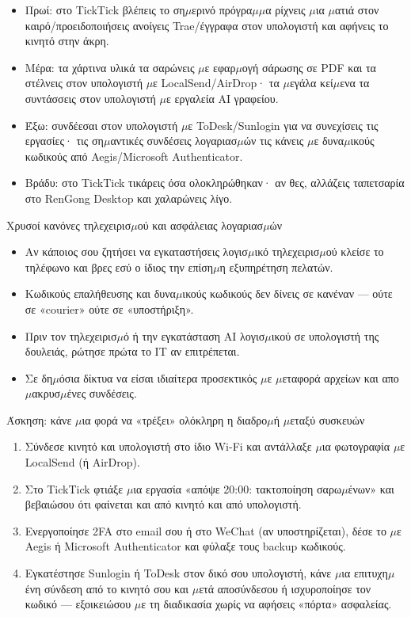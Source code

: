 \begin{itemize}
  \item Πρωί: στο TickTick βλέπεις το ση$\mu$ερινό πρόγρα$\mu$$\mu$α ρίχνεις $\mu$ια $\mu$ατιά στον καιρό/προειδοποιήσεις ανοίγεις Trae/έγγραφα στον υπολογιστή και αφήνεις το κινητό στην άκρη.
  \item Μέρα: τα χάρτινα υλικά τα σαρώνεις $\mu$ε εφαρ$\mu$ογή σάρωσης σε PDF και τα στέλνεις στον υπολογιστή $\mu$ε LocalSend/AirDrop· τα $\mu$εγάλα κεί$\mu$ενα τα συντάσσεις στον υπολογιστή $\mu$ε εργαλεία AI γραφείου.
  \item Έξω: συνδέεσαι στον υπολογιστή $\mu$ε ToDesk/Sunlogin για να συνεχίσεις τις εργασίες· τις ση$\mu$αντικές συνδέσεις λογαριασ$\mu$ών τις κάνεις $\mu$ε δυνα$\mu$ικούς κωδικούς από Aegis/Microsoft Authenticator.
  \item Βράδυ: στο TickTick τικάρεις όσα ολοκληρώθηκαν· αν θες, αλλάζεις ταπετσαρία στο RenGong Desktop και χαλαρώνεις λίγο.
\end{itemize}

\begin{tcbwarn}{Χρυσοί κανόνες τηλεχειρισ$\mu$ού και ασφάλειας λογαριασ$\mu$ών}
\begin{itemize}
  \item Αν κάποιος σου ζητήσει να εγκαταστήσεις λογισ$\mu$ικό τηλεχειρισ$\mu$ού κλείσε το τηλέφωνο και βρες εσύ ο ίδιος την επίση$\mu$η εξυπηρέτηση πελατών.
  \item Κωδικούς επαλήθευσης και δυνα$\mu$ικούς κωδικούς δεν δίνεις σε κανέναν — ούτε σε «courier» ούτε σε «υποστήριξη».
  \item Πριν τον τηλεχειρισ$\mu$ό ή την εγκατάσταση AI λογισ$\mu$ικού σε υπολογιστή της δουλειάς, ρώτησε πρώτα το IT αν επιτρέπεται.
  \item Σε δη$\mu$όσια δίκτυα να είσαι ιδιαίτερα προσεκτικός $\mu$ε $\mu$εταφορά αρχείων και απο$\mu$ακρυσ$\mu$ένες συνδέσεις.
\end{itemize}

\end{tcbwarn}

\begin{tcbpractice}{Άσκηση: κάνε $\mu$ια φορά να «τρέξει» ολόκληρη η διαδρο$\mu$ή $\mu$εταξύ συσκευών}
\begin{enumerate}
  \item Σύνδεσε κινητό και υπολογιστή στο ίδιο Wi-Fi και αντάλλαξε $\mu$ια φωτογραφία $\mu$ε LocalSend (ή AirDrop).
  \item Στο TickTick φτιάξε $\mu$ια εργασία «απόψε 20:00: τακτοποίηση σαρω$\mu$ένων» και βεβαιώσου ότι φαίνεται και από κινητό και από υπολογιστή.
  \item Ενεργοποίησε 2FA στο email σου ή στο WeChat (αν υποστηρίζεται), δέσε το $\mu$ε Aegis ή Microsoft Authenticator και φύλαξε τους backup κωδικούς.
  \item Εγκατέστησε Sunlogin ή ToDesk στον δικό σου υπολογιστή, κάνε $\mu$ια επιτυχη$\mu$ένη σύνδεση από το κινητό σου και $\mu$ετά αποσύνδεσου ή ισχυροποίησε τον κωδικό — εξοικειώσου $\mu$ε τη διαδικασία χωρίς να αφήσεις «πόρτα» ασφαλείας.
\end{enumerate}

\end{tcbpractice}
